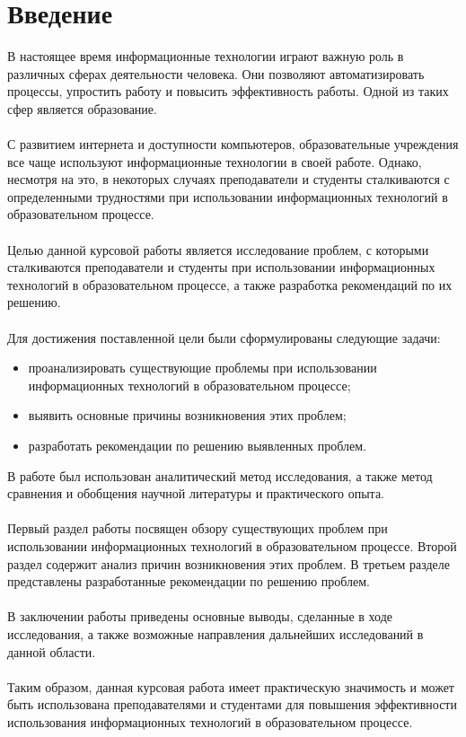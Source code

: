\documentclass{article}
\begin{document}
\section{Введение}
В настоящее время информационные технологии играют важную роль в различных сферах деятельности человека. Они позволяют автоматизировать процессы, упростить работу и повысить эффективность работы. Одной из таких сфер является образование.\\
~\\
С развитием интернета и доступности компьютеров, образовательные учреждения все чаще используют информационные технологии в своей работе. Однако, несмотря на это, в некоторых случаях преподаватели и студенты сталкиваются с определенными трудностями при использовании информационных технологий в образовательном процессе.\\
~\\
Целью данной курсовой работы является исследование проблем, с которыми сталкиваются преподаватели и студенты при использовании информационных технологий в образовательном процессе, а также разработка рекомендаций по их решению.\\
~\\
Для достижения поставленной цели были сформулированы следующие задачи:
\begin{itemize}
\item проанализировать существующие проблемы при использовании информационных технологий в образовательном процессе;
\item выявить основные причины возникновения этих проблем;
\item разработать рекомендации по решению выявленных проблем.
\end{itemize}
В работе был использован аналитический метод исследования, а также метод сравнения и обобщения научной литературы и практического опыта.\\
~\\
Первый раздел работы посвящен обзору существующих проблем при использовании информационных технологий в образовательном процессе. Второй раздел содержит анализ причин возникновения этих проблем. В третьем разделе представлены разработанные рекомендации по решению проблем.\\
~\\
В заключении работы приведены основные выводы, сделанные в ходе исследования, а также возможные направления дальнейших исследований в данной области.\\
~\\
Таким образом, данная курсовая работа имеет практическую значимость и может быть использована преподавателями и студентами для повышения эффективности использования информационных технологий в образовательном процессе.
\end{document}
